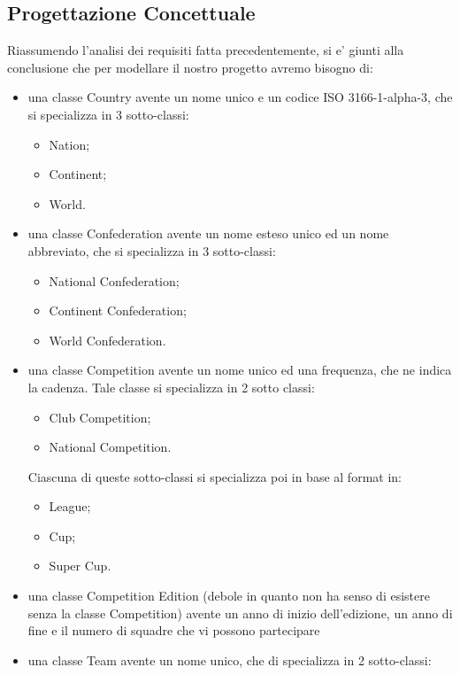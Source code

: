 \newpage
\subsection{Progettazione Concettuale}

Riassumendo l'analisi dei requisiti fatta precedentemente, si e' giunti alla conclusione
che per modellare il nostro progetto avremo bisogno di:
\begin{itemize}
	\item una classe Country avente un nome unico e un codice ISO 3166-1-alpha-3,
		che si specializza in 3 sotto-classi:	
		\begin{itemize}
			\item Nation;
			\item Continent;
			\item World.
		\end{itemize}
	\item una classe Confederation avente un nome esteso unico ed un nome abbreviato,
		che si specializza in 3 sotto-classi:	
		\begin{itemize}
			\item National Confederation;
			\item Continent Confederation;
			\item World Confederation.
		\end{itemize}
	\item una classe Competition avente un nome unico ed una frequenza, che ne indica la
		cadenza. Tale classe si specializza in 2 sotto classi:	
		\begin{itemize}
			\item Club Competition;
			\item National Competition.
		\end{itemize}	
		Ciascuna di queste sotto-classi si specializza poi in base al format in:
		\begin{itemize}
			\item League;
			\item Cup;
			\item Super Cup.
		\end{itemize}
	\item una classe Competition Edition (debole in quanto non ha senso di esistere
		senza la classe Competition) avente un anno di inizio dell'edizione, un anno di fine
		e il numero di squadre che vi possono partecipare	
	\item una classe Team avente un nome unico, che di specializza in 2 sotto-classi:
		\begin{itemize}

\end{itemize}
\end{itemize}
